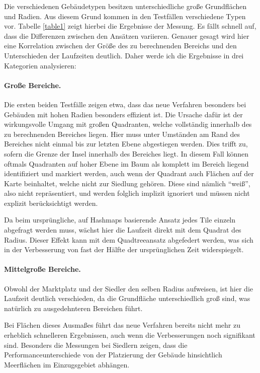 \documentclass[%
			paper=a4,%
			DIV12,
			liststotoc,
			bibtotoc,
			draft=false,%
			titlepage,
			numbers=noendperiod
			]{scrartcl}
\begin{document}
Die verschiedenen Gebäudetypen besitzen unterschiedliche große Grundflächen und Radien.
Aus diesem Grund kommen in den Testfällen verschiedene Typen vor.
Tabelle \ref{table1} zeigt hierbei die Ergebnisse der Messung.
Es fällt schnell auf, dass die Differenzen zwischen den Ansätzen variieren.
Genauer gesagt wird hier eine Korrelation zwischen der Größe des zu berechnenden Bereichs und den Unterschieden der Laufzeiten deutlich. Daher werde ich die Ergebnisse in drei Kategorien analysieren:

\paragraph{Große Bereiche.}
Die ersten beiden Testfälle zeigen etwa, dass das neue Verfahren besonders bei Gebäuden mit hohen Radien besonders effizient ist.
Die Ursache dafür ist der wirkungsvolle Umgang mit großen Quadranten, welche vollständig innerhalb des zu berechnenden Bereiches liegen.
Hier muss unter Umständen am Rand des Bereiches nicht einmal bis zur letzten Ebene abgestiegen werden.
Dies trifft zu, sofern die Grenze der Insel innerhalb des Bereiches liegt.
In diesem Fall können oftmals Quadranten auf hoher Ebene im Baum als komplett im Bereich liegend identifiziert und markiert werden, auch wenn der Quadrant auch Flächen auf der Karte beinhaltet, welche nicht zur Siedlung gehören.
Diese sind nämlich "`weiß"', also nicht repräsentiert, und werden folglich implizit ignoriert und müssen nicht explizit berücksichtigt werden.

Da beim ursprüngliche, auf Hashmaps basierende Ansatz jedes Tile einzeln abgefragt werden muss, wächst hier die Laufzeit direkt mit dem Quadrat des Radius. Dieser Effekt kann mit dem Quadtreeansatz abgefedert werden, was sich in der Verbesserung von fast der Hälfte der ursprünglichen Zeit widerspiegelt.

\paragraph{Mittelgroße Bereiche.}
Obwohl der Marktplatz und der Siedler den selben Radius aufweisen, ist hier die Laufzeit deutlich verschieden, da die Grundfläche unterschiedlich groß sind, was natürlich zu ausgedehnteren Bereichen führt.

Bei Flächen dieses Ausmaßes führt das neue Verfahren bereits nicht mehr zu erheblich schnelleren Ergebnissen, auch wenn die Verbesserungen noch signifikant sind.
Besonders die Messungen bei Siedlern zeigen, dass die Performanceunterschiede von der Platzierung der Gebäude hinsichtlich Meerflächen im Einzugsgebiet abhängen.
\end{document}
